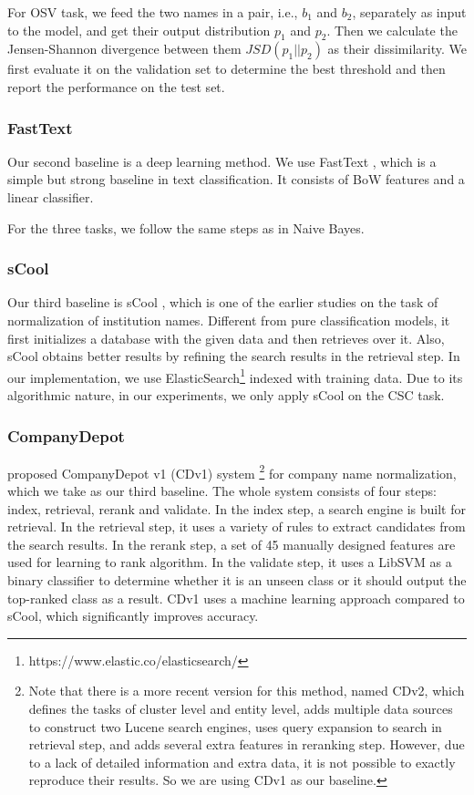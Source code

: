 \documentclass{article}
\begin{document}
For OSV task, we feed the two names in a pair, i.e., $b_1$ and $b_2$, separately as input to the model, and get their output distribution $p_1$ and $p_2$.
Then we calculate the Jensen-Shannon divergence between them $JSD(p_1||p_2)$ as their dissimilarity. 
We first evaluate it on the validation set to determine the best threshold and then report the performance on the test set.

\subsubsection{FastText}
Our second baseline is a deep learning method. We use FastText \cite{joulin2016bag}
, which is a simple but strong baseline in text classification. It consists of BoW features and a linear classifier.

For the three tasks, we follow the same steps as in Naive Bayes.

\subsubsection{sCool}
Our third baseline is sCool \cite{jacob2014scool}, which is one of the earlier studies on the task of normalization of institution names.
Different from pure classification models, it first initializes a database with the given data and then retrieves over it. Also, sCool obtains better results by refining the search results in the retrieval step. In our implementation, we use ElasticSearch\footnote{https://www.elastic.co/elasticsearch/} indexed with training data. Due to its algorithmic nature, in our experiments, we only apply sCool on the CSC task. 


\subsubsection{CompanyDepot} \cite{liu2016companydepot} proposed CompanyDepot v1 (CDv1) system
\footnote{Note that there is a more recent version for this method, named CDv2, which defines the tasks of cluster level and entity level, adds multiple data sources to construct two Lucene search engines, uses query expansion to search in retrieval step, and adds several extra features in reranking step. However, due to a lack of detailed information and extra data, it is not possible to exactly reproduce their results. So we are using CDv1 as our baseline. } 
for company name normalization, which we take as our third baseline. The whole system consists of four steps: index, retrieval, rerank and validate. In the index step, a search engine is built for retrieval. In the retrieval step, it uses a variety of rules to extract candidates from the search results. In the rerank step, a set of 45 manually designed features are used for learning to rank algorithm. In the validate step, it uses a LibSVM as a binary classifier to determine whether it is an unseen class or it should output the top-ranked class as a result. CDv1 uses a machine learning approach compared to sCool, which significantly improves accuracy.
\end{document}

